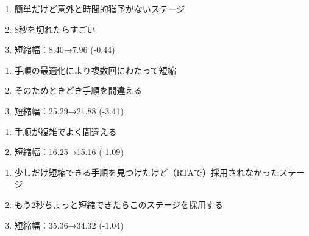 \begin{enumerate}[label={\sarrow}]
\item 簡単だけど意外と時間的猶予がないステージ
\item 8秒を切れたらすごい
\item 短縮幅：8.40→7.96 (-0.44)
\end{enumerate}



\begin{enumerate}[label={\sarrow}]
\item 手順の最適化により複数回にわたって短縮
\item そのためときどき手順を間違える
\item 短縮幅：25.29→21.88 (-3.41)
\end{enumerate}



\begin{enumerate}[label={\sarrow}]
\item 手順が複雑でよく間違える
\item 短縮幅：16.25→15.16 (-1.09)
\end{enumerate}



\begin{enumerate}[label={\sarrow}]
\item 少しだけ短縮できる手順を見つけたけど（RTAで）採用されなかったステージ
\item もう2秒ちょっと短縮できたらこのステージを採用する
\item 短縮幅：35.36→34.32 (-1.04)
\end{enumerate}



